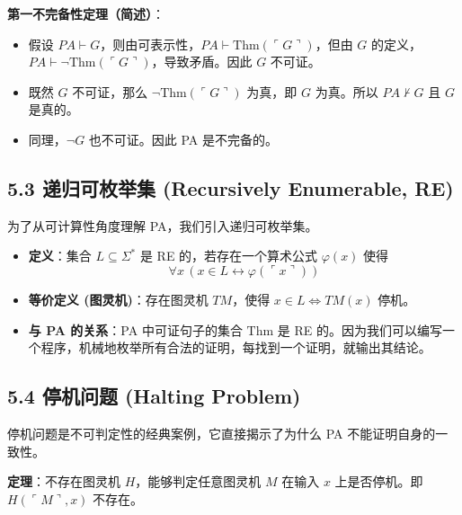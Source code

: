 \documentclass[12pt, a4paper]{article}
\begin{document}
\textbf{第一不完备性定理（简述）}：
\begin{itemize}
    \item 假设 \(PA \vdash G\)，则由可表示性，\(PA \vdash \text{Thm}(\ulcorner G \urcorner)\)，但由 \(G\) 的定义，\(PA \vdash \neg \text{Thm}(\ulcorner G \urcorner)\)，导致矛盾。因此 \(G\) 不可证。
    \item 既然 \(G\) 不可证，那么 \(\neg \text{Thm}(\ulcorner G \urcorner)\) 为真，即 \(G\) 为真。所以 \(PA \nvdash G\) 且 \(G\) 是真的。
    \item 同理，\(\neg G\) 也不可证。因此 PA 是不完备的。
\end{itemize}

\subsection*{5.3 递归可枚举集 (Recursively Enumerable, RE)}

为了从可计算性角度理解 PA，我们引入递归可枚举集。

\begin{itemize}
    \item \textbf{定义}：集合 \(L \subseteq \Sigma^*\) 是 RE 的，若存在一个算术公式 \(\varphi(x)\) 使得
    \[
    \forall x \, (x \in L \leftrightarrow \varphi(\ulcorner x \urcorner))
    \]
    \item \textbf{等价定义 (图灵机)}：存在图灵机 \(TM\)，使得 \(x \in L \iff TM(x) \text{ 停机}\)。
    \item \textbf{与 PA 的关系}：PA 中可证句子的集合 \(\text{Thm}\) 是 RE 的。因为我们可以编写一个程序，机械地枚举所有合法的证明，每找到一个证明，就输出其结论。
\end{itemize}

\subsection*{5.4 停机问题 (Halting Problem)}

停机问题是不可判定性的经典案例，它直接揭示了为什么 PA 不能证明自身的一致性。

\begin{mdframed}
    \textbf{定理}：不存在图灵机 \(H\)，能够判定任意图灵机 \(M\) 在输入 \(x\) 上是否停机。即 \(H(\ulcorner M \urcorner, x)\) 不存在。
\end{mdframed}
\end{document}
